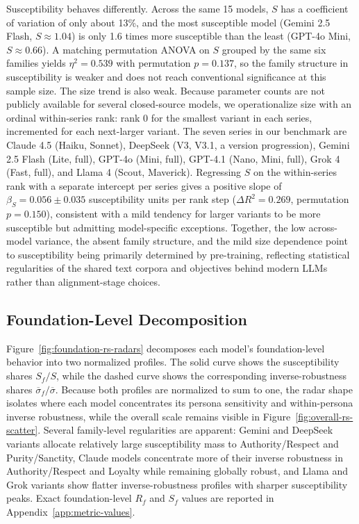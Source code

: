 \documentclass{article}
\begin{document}
Susceptibility behaves differently. Across the same 15 models, $S$ has a coefficient of variation of only about 13\%, and the most susceptible model (Gemini 2.5 Flash, $S\approx 1.04$) is only 1.6 times more susceptible than the least (GPT-4o Mini, $S\approx 0.66$). A matching permutation ANOVA on \(S\) grouped by the same six families yields \(\eta^2 = 0.539\) with permutation \(p = 0.137\), so the family structure in susceptibility is weaker and does not reach conventional significance at this sample size. The size trend is also weak. Because parameter counts are not publicly available for several closed-source models, we operationalize size with an ordinal within-series rank: rank 0 for the smallest variant in each series, incremented for each next-larger variant. The seven series in our benchmark are Claude 4.5 (Haiku, Sonnet), DeepSeek (V3, V3.1, a version progression), Gemini 2.5 Flash (Lite, full), GPT-4o (Mini, full), GPT-4.1 (Nano, Mini, full), Grok 4 (Fast, full), and Llama 4 (Scout, Maverick). Regressing $S$ on the within-series rank with a separate intercept per series gives a positive slope of \(\beta_S = 0.056 \pm 0.035\) susceptibility units per rank step (\(\Delta R^2 = 0.269\), permutation \(p = 0.150\)), consistent with a mild tendency for larger variants to be more susceptible but admitting model-specific exceptions. Together, the low across-model variance, the absent family structure, and the mild size dependence point to susceptibility being primarily determined by pre-training, reflecting statistical regularities of the shared text corpora and objectives behind modern LLMs rather than alignment-stage choices.

\subsection{Foundation-Level Decomposition}
\label{sec:foundation-rs-map}

Figure~\ref{fig:foundation-rs-radars} decomposes each model's foundation-level behavior into two normalized profiles. The solid curve shows the susceptibility shares \(S_f / S\), while the dashed curve shows the corresponding inverse-robustness shares \(\overline{\sigma}_f / \overline{\sigma}\). Because both profiles are normalized to sum to one, the radar shape isolates where each model concentrates its persona sensitivity and within-persona inverse robustness, while the overall scale remains visible in Figure~\ref{fig:overall-rs-scatter}. Several family-level regularities are apparent: Gemini and DeepSeek variants allocate relatively large susceptibility mass to Authority/Respect and Purity/Sanctity, Claude models concentrate more of their inverse robustness in Authority/Respect and Loyalty while remaining globally robust, and Llama and Grok variants show flatter inverse-robustness profiles with sharper susceptibility peaks. Exact foundation-level \(R_f\) and \(S_f\) values are reported in Appendix~\ref{app:metric-values}.
\end{document}
